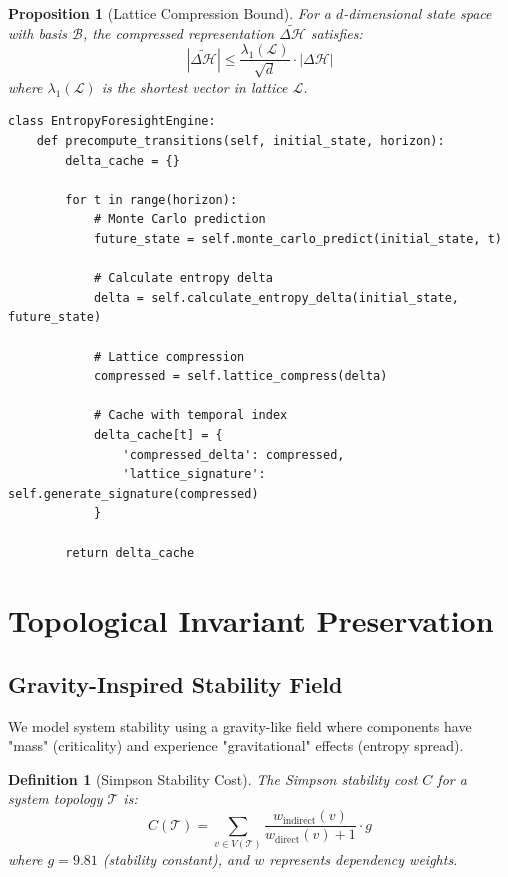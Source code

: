 \documentclass[11pt,a4paper]{article}
\newtheorem{definition}[theorem]{Definition}
\newtheorem{proposition}[theorem]{Proposition}
\newcommand{\entropy}{\mathcal{H}}
\newcommand{\deltaentropy}{\Delta\entropy}
\begin{document}
\begin{proposition}[Lattice Compression Bound]
For a $d$-dimensional state space with basis $\mathcal{B}$, the compressed representation $\tilde{\deltaentropy}$ satisfies:
\begin{equation}
|\tilde{\deltaentropy}| \leq \frac{\lambda_1(\mathcal{L})}{\sqrt{d}} \cdot |\deltaentropy|
\end{equation}
where $\lambda_1(\mathcal{L})$ is the shortest vector in lattice $\mathcal{L}$.
\end{proposition}

\begin{verbatim}
class EntropyForesightEngine:
    def precompute_transitions(self, initial_state, horizon):
        delta_cache = {}
        
        for t in range(horizon):
            # Monte Carlo prediction
            future_state = self.monte_carlo_predict(initial_state, t)
            
            # Calculate entropy delta
            delta = self.calculate_entropy_delta(initial_state, future_state)
            
            # Lattice compression
            compressed = self.lattice_compress(delta)
            
            # Cache with temporal index
            delta_cache[t] = {
                'compressed_delta': compressed,
                'lattice_signature': self.generate_signature(compressed)
            }
            
        return delta_cache
\end{verbatim}

\section{Topological Invariant Preservation}

\subsection{Gravity-Inspired Stability Field}

We model system stability using a gravity-like field where components have "mass" (criticality) and experience "gravitational" effects (entropy spread).

\begin{definition}[Simpson Stability Cost]
The Simpson stability cost $C$ for a system topology $\mathcal{T}$ is:
\begin{equation}
C(\mathcal{T}) = \sum_{v \in V(\mathcal{T})} \frac{w_{\text{indirect}}(v)}{w_{\text{direct}}(v) + 1} \cdot g
\end{equation}
where $g = 9.81$ (stability constant), and $w$ represents dependency weights.
\end{definition}
\end{document}

